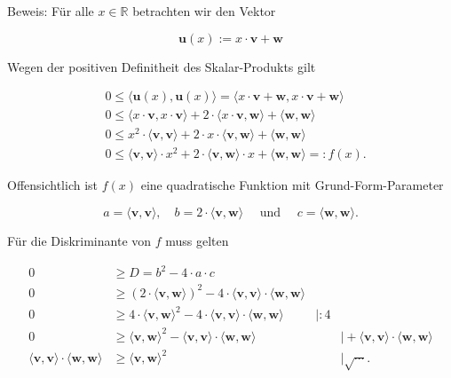\documentclass[10pt]{article}
\begin{document}
Beweis: Für alle $x \in \mathbb{R}$ betrachten wir den Vektor


\begin{equation*}
\mathbf{u}(x):=x \cdot \mathbf{v}+\mathbf{w} \tag{7.78}
\end{equation*}


Wegen der positiven Definitheit des Skalar-Produkts gilt


\begin{align*}
& 0 \leq\langle\mathbf{u}(x), \mathbf{u}(x)\rangle=\langle x \cdot \mathbf{v}+\mathbf{w}, x \cdot \mathbf{v}+\mathbf{w}\rangle  \tag{7.79}\\
& 0 \leq\langle x \cdot \mathbf{v}, x \cdot \mathbf{v}\rangle+2 \cdot\langle x \cdot \mathbf{v}, \mathbf{w}\rangle+\langle\mathbf{w}, \mathbf{w}\rangle  \tag{7.80}\\
& 0 \leq x^{2} \cdot\langle\mathbf{v}, \mathbf{v}\rangle+2 \cdot x \cdot\langle\mathbf{v}, \mathbf{w}\rangle+\langle\mathbf{w}, \mathbf{w}\rangle  \tag{7.81}\\
& 0 \leq\langle\mathbf{v}, \mathbf{v}\rangle \cdot x^{2}+2 \cdot\langle\mathbf{v}, \mathbf{w}\rangle \cdot x+\langle\mathbf{w}, \mathbf{w}\rangle=: f(x) . \tag{7.82}
\end{align*}


Offensichtlich ist $f(x)$ eine quadratische Funktion mit Grund-Form-Parameter


\begin{equation*}
a=\langle\mathbf{v}, \mathbf{v}\rangle, \quad b=2 \cdot\langle\mathbf{v}, \mathbf{w}\rangle \quad \text { und } \quad c=\langle\mathbf{w}, \mathbf{w}\rangle . \tag{7.83}
\end{equation*}


Für die Diskriminante von $f$ muss gelten

\[
\begin{array}{rlrl}
0 & \geq D=b^{2}-4 \cdot a \cdot c & \\
0 & \geq(2 \cdot\langle\mathbf{v}, \mathbf{w}\rangle)^{2}-4 \cdot\langle\mathbf{v}, \mathbf{v}\rangle \cdot\langle\mathbf{w}, \mathbf{w}\rangle & \\
0 & \geq 4 \cdot\langle\mathbf{v}, \mathbf{w}\rangle^{2}-4 \cdot\langle\mathbf{v}, \mathbf{v}\rangle \cdot\langle\mathbf{w}, \mathbf{w}\rangle & \mid: 4 \\
0 & \geq\langle\mathbf{v}, \mathbf{w}\rangle^{2}-\langle\mathbf{v}, \mathbf{v}\rangle \cdot\langle\mathbf{w}, \mathbf{w}\rangle & & \mid+\langle\mathbf{v}, \mathbf{v}\rangle \cdot\langle\mathbf{w}, \mathbf{w}\rangle \\
\langle\mathbf{v}, \mathbf{v}\rangle \cdot\langle\mathbf{w}, \mathbf{w}\rangle & \geq\langle\mathbf{v}, \mathbf{w}\rangle^{2} & & \mid \sqrt{\cdots} . \tag{7.88}
\end{array}
\]
\end{document}
